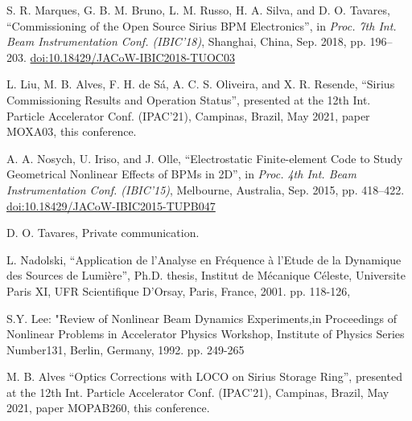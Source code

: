 \documentclass[a4paper,
               keeplastbox,   %
               ]{jacow}
\begin{document}
%
%
%
	{\printbibliography}%
	{%
	
	\begin{thebibliography}{99}   %
	
       S. R. Marques, G. B. M. Bruno, L. M. Russo, H. A. Silva, and D. O. Tavares,
       \textquotedblleft{Commissioning of the Open Source Sirius BPM Electronics}\textquotedblright,
       in \emph{Proc. 7th Int. Beam Instrumentation Conf. (IBIC’18)}, Shanghai, China, Sep. 2018, pp. 196--203.
       \url{doi:10.18429/JACoW-IBIC2018-TUOC03}
    
       L. Liu, M. B. Alves, F. H. de Sá, A. C. S. Oliveira, and X. R. Resende,
       \textquotedblleft{Sirius Commissioning Results and Operation Status}\textquotedblright,
       presented at the 12th Int. Particle Accelerator Conf. (IPAC’21), Campinas, Brazil, May 2021, paper MOXA03, this conference.    
       
        A. A. Nosych, U. Iriso, and J. Olle,
       \textquotedblleft{Electrostatic Finite-element Code to Study Geometrical Nonlinear Effects of BPMs in 2D}\textquotedblright,
       in \emph{Proc. 4th Int. Beam Instrumentation Conf. (IBIC’15)}, Melbourne, Australia, Sep. 2015, pp. 418--422.
       \url{doi:10.18429/JACoW-IBIC2015-TUPB047}
       
       D. O. Tavares, Private communication.


        L. Nadolski, “Application de l'Analyse en Fréquence à l'Etude de la Dynamique des Sources de Lumière”, Ph.D. thesis, Institut de Mécanique Céleste,
 	    Universite Paris XI, UFR Scientifique D'Orsay, Paris, France, 2001. pp. 118-126, 
	
	    S.Y. Lee: "Review of Nonlinear Beam Dynamics Experiments,in Proceedings of Nonlinear Problems in Accelerator Physics Workshop, Institute of Physics Series Number131, Berlin, Germany, 1992. pp. 249-265
    
    
       M. B. Alves
       \textquotedblleft{Optics Corrections with LOCO on Sirius Storage Ring}\textquotedblright,
       presented at the 12th Int. Particle Accelerator Conf. (IPAC’21), Campinas, Brazil, May 2021, paper MOPAB260, this conference.    
       
    

    
    
   
	\end{thebibliography}
} %
%
% 

%
\end{document}
